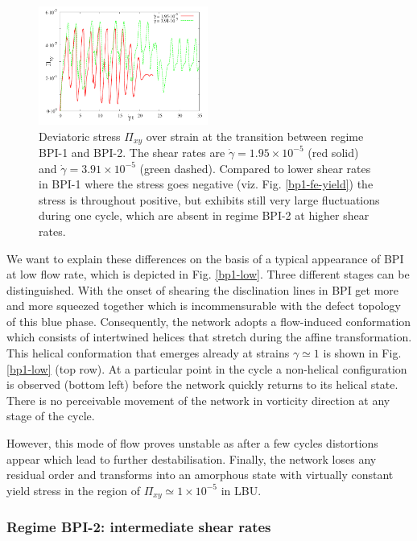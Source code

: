 \documentclass[aps,pre,reprint,superscriptaddress, twocolumn]{revtex4}
\newcommand{\e}[1]{\times10^{#1}}
\newcommand{\gd}{\dot{\gamma}}
\begin{document}
\begin{figure}[htpb]
\includegraphics[width=0.495\textwidth]{stress_bp1-1_bp1-2.pdf}
\caption{Deviatoric stress $\Pi_{xy}$ over strain at the transition between regime
BPI-1 and BPI-2. The shear rates are $\gd=1.95\e{-5}$ (red solid) 
and $\gd=3.91\e{-5}$ (green dashed). Compared to lower shear rates in BPI-1 
where the stress goes negative (viz. Fig. \ref{bp1-fe-yield}) the stress is 
throughout positive, but exhibits still very large fluctuations during one cycle, 
which are absent in regime BPI-2 at higher shear rates.}
\label{bp1-1_bp1-2}
\end{figure}

We want to explain these differences on the basis of a typical 
appearance of BPI at low flow rate, which is depicted in Fig. \ref{bp1-low}.
Three different stages can be distinguished. 
With the onset of shearing the disclination lines 
in BPI get more and more squeezed together which is incommensurable with 
the defect topology of this blue phase. 
Consequently, the network adopts a flow-induced conformation which consists 
of intertwined helices that stretch during the affine transformation.
This helical conformation that emerges already at strains $\gamma\simeq1$ 
is shown in Fig. \ref{bp1-low} (top row).
At a particular point in the cycle a non-helical configuration is
observed (bottom left) before the network quickly returns
to its helical state.
There is no perceivable movement of the network in vorticity 
direction at any stage of the cycle.


However, this mode of flow proves unstable as after a few cycles 
distortions appear which lead to further destabilisation.
Finally, the network loses any residual order and 
transforms into an amorphous state with virtually constant
yield stress in the region of $\Pi_{xy}\simeq 1\e{-5}$ in LBU.

\subsubsection{Regime BPI-2: intermediate shear rates}
\end{document}
